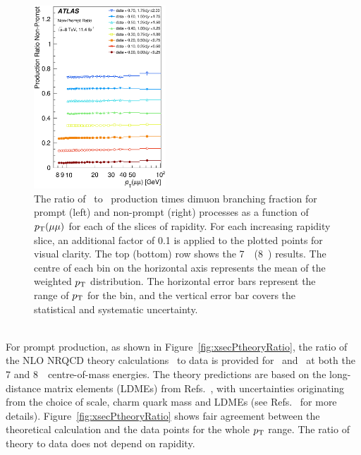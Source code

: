 \begin{description}[style=unboxed,leftmargin=0cm]
\begin{figure} [!ht]
\begin{center}
    \includegraphics[width=0.44\textwidth]{figures/ct_8TeV_NP_Ratio.eps}\hfil
    \caption{The ratio of \psiprime\ to \jpsi\ production times dimuon branching fraction for prompt (left) and non-prompt (right) processes
    as a function of $\mbox{$p_{\text{T}}$}(\mu\mu)$  for each of the slices of rapidity. 
    For each increasing rapidity slice, an additional factor of 0.1 is applied to the plotted points for visual clarity.
    The top (bottom) row shows the 7~\TeV\ (8~\TeV) results.
      The centre of each bin on the horizontal axis represents the mean of the weighted $\mbox{$p_{\text{T}}$}$ distribution. The
      horizontal error bars represent the range of $\mbox{$p_{\text{T}}$}$ for the bin, and the vertical error bar covers the statistical and systematic uncertainty.}
    \label{fig:res:PNP_Ratio}
  \end{center}
\end{figure} 

\clearpage


\item[Comparison with theory] \hfill \\
For prompt production, as shown in Figure~\ref{fig:xsecPtheoryRatio}, the ratio of the NLO NRQCD theory calculations~\cite{Shao:2012iz} 
to data is provided for \Jpsi\ and \psiprime\ at both the 7 and 8~\TeV\ centre-of-mass energies.
The theory predictions are 
based on the long-distance matrix elements (LDMEs) from Refs.~\cite{NRQCD1,Ma:2010vd}, with uncertainties originating from the
choice of scale, charm quark mass and LDMEs (see Refs.~\cite{Shao:2012iz,Kanaki:2000ey,NRQCD1,Ma:2010vd} for more details).
Figure~\ref{fig:xsecPtheoryRatio} shows fair agreement between the theoretical calculation and the data points for the whole $\mbox{$p_{\text{T}}$}$ range. 
The ratio of theory to data does not depend on rapidity.


\end{description}
